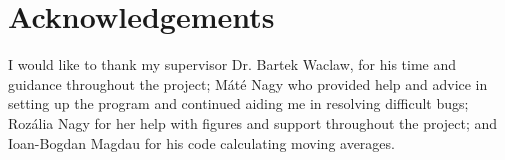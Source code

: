 \documentclass[a4paper,12pt]{article}
\begin{document}
	
	\section*{Acknowledgements}
	
	I would like to thank my supervisor Dr. Bartek Waclaw, for his time and guidance throughout the project; Máté Nagy who provided help and advice in setting up the program and continued aiding me in resolving difficult bugs; Rozália Nagy for her help with figures and support throughout the project; and Ioan-Bogdan Magdau for his code calculating moving averages. 

	
	


\end{document}
